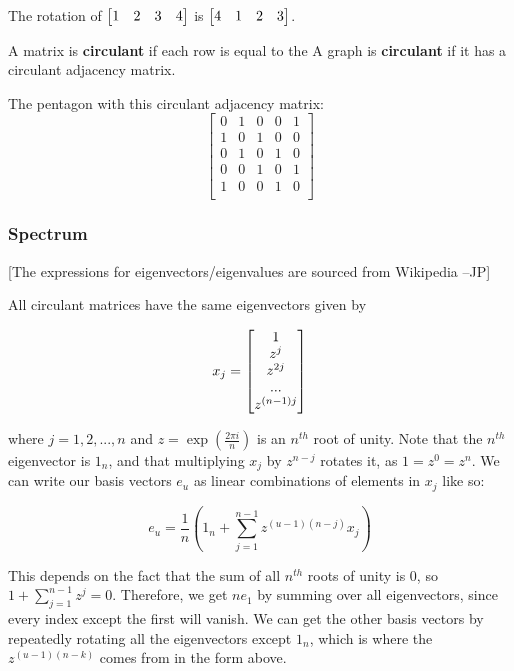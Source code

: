 \begin{example}
  The rotation of $\begin{bmatrix}1 & 2 & 3 & 4 \end{bmatrix}$ is $\begin{bmatrix}4 & 1 & 2 & 3 \end{bmatrix}$.
\end{example}

\begin{definition}
  A matrix is {\bf circulant} if each row is equal to the A graph is {\bf
    circulant} if it has a circulant adjacency matrix.
\end{definition}

\begin{example}
  The pentagon with this circulant adjacency matrix:
  \[
    \begin{bmatrix}
      0 & 1 & 0 & 0 & 1 \\
      1 & 0 & 1 & 0 & 0 \\
      0 & 1 & 0 & 1 & 0 \\
      0 & 0 & 1 & 0 & 1 \\
      1 & 0 & 0 & 1 & 0 \\
    \end{bmatrix}
  \]
\end{example}

\subsubsection*{Spectrum}

[The expressions for eigenvectors/eigenvalues are sourced from Wikipedia --JP]

All circulant matrices have the same eigenvectors given by

\[x_j = \begin{bmatrix}1 \\ z^j \\ z^{2j} \\ ... \\ z^{(n-1)j} \end{bmatrix}\]

where $j=1,2,...,n$ and $z=\exp(\frac{2 \pi i}{n})$ is an $n^{th}$ root of
unity. Note that the $n^{th}$ eigenvector is $1_n$, and that multiplying $x_j$
by $z^{n-j}$ rotates it, as $1 = z^0 = z^n$. We can write our basis vectors $e_u$ as
linear combinations of elements in $x_j$ like so:

\[e_u = \frac{1}{n}(1_n + \sum^{n-1}_{j=1} z^{(u-1)(n-j)} x_j)\]

This depends on the fact that the sum of all $n^{th}$ roots of unity is 0, so
$1 + \sum_{j=1}^{n-1}z^j = 0$. Therefore, we get $ne_1$ by summing over all
eigenvectors, since every index except the first will vanish. We can get the
other basis vectors by repeatedly rotating all the eigenvectors except $1_n$,
which is where the $z^{(u-1)(n-k)}$ comes from in the form above.

